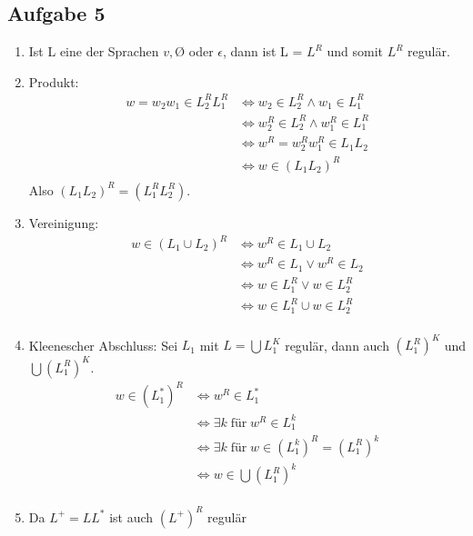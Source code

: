 \subsection*{Aufgabe 5}
\begin{enumerate}
  \item Ist L eine der Sprachen ${v}, Ø$ oder ${\epsilon}$, dann ist L = $L^R$ und somit $L^R$ regulär.
  \item Produkt:
  \begin{align*}
    w = w_2w_1 \in L_2^R L_1^R &\iff w_2 \in L_2^R \land w_1 \in L_1^R \\
    &\iff w_2^R \in L_2^R \land w_1^R \in L_1^R \\
    &\iff w^R = w_2^R w_1^R \in L_1 L_2 \\
    &\iff w \in (L_1 L_2)^R \\
  \end{align*}
  Also $(L_1 L_2)^R = (L_1^R L_2^R)$.

  \item Vereinigung:
  \begin{align*}
    w \in (L_1 \cup L_2)^R &\iff w^R \in L_1 \cup L_2 \\
    &\iff w^R \in L_1 \lor w^R \in L_2  \\
    &\iff w \in L_1^R \lor w \in L_2^R \\
    &\iff w \in L_1^R \cup w \in L_2^R \\
  \end{align*}


  \item Kleenescher Abschluss:
  Sei $L_1$ mit $L=\bigcup L_1^K$ regulär, dann auch $(L_1^R)^K$ und $\bigcup (L_1^R)^K$.
  \begin{align*}
    w \in (L_1^*)^R &\iff w^R \in L_1^* \\
    &\iff \exists k \; \text{für} \; w^R \in L_1^k \\
    &\iff \exists k \; \text{für} \; w \in (L_1^k)^R = (L_1^R)^k \\
    &\iff w \in \bigcup (L_1^R)^k \\
  \end{align*}

  \item Da $L^+ = LL^*$ ist auch $(L^+)^R$ regulär



\end{enumerate}
